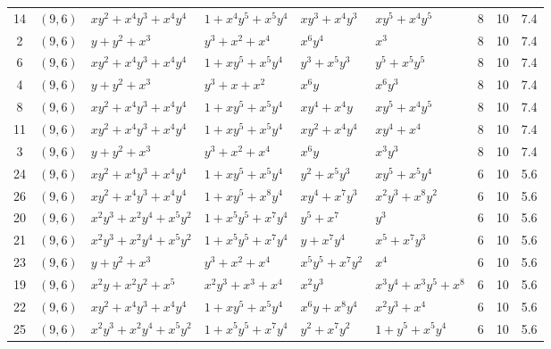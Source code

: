\begin{table}[t]
\begin{tabular*}{\textwidth}{@{\extracolsep{\fill}}cllllllcc}
14 & $(9,6)$ & $xy^{2}{+}x^{4}y^{3}{+}x^{4}y^{4}$ & $1{+}x^{4}y^{5}{+}x^{5}y^{4}$ & $xy^{3}{+}x^{4}y^{3}$ & $xy^{5}{+}x^{4}y^{5}$ & 8 & 10 & 7.4 \\
2 & $(9,6)$ & $y{+}y^{2}{+}x^{3}$ & $y^{3}{+}x^{2}{+}x^{4}$ & $x^{6}y^{4}$ & $x^{3}$ & 8 & 10 & 7.4 \\
6 & $(9,6)$ & $xy^{2}{+}x^{4}y^{3}{+}x^{4}y^{4}$ & $1{+}xy^{5}{+}x^{5}y^{4}$ & $y^{3}{+}x^{5}y^{3}$ & $y^{5}{+}x^{5}y^{5}$ & 8 & 10 & 7.4 \\
4 & $(9,6)$ & $y{+}y^{2}{+}x^{3}$ & $y^{3}{+}x{+}x^{2}$ & $x^{6}y$ & $x^{6}y^{3}$ & 8 & 10 & 7.4 \\
8 & $(9,6)$ & $xy^{2}{+}x^{4}y^{3}{+}x^{4}y^{4}$ & $1{+}xy^{5}{+}x^{5}y^{4}$ & $xy^{4}{+}x^{4}y$ & $xy^{5}{+}x^{4}y^{5}$ & 8 & 10 & 7.4 \\
11 & $(9,6)$ & $xy^{2}{+}x^{4}y^{3}{+}x^{4}y^{4}$ & $1{+}xy^{5}{+}x^{5}y^{4}$ & $xy^{2}{+}x^{4}y^{4}$ & $xy^{4}{+}x^{4}$ & 8 & 10 & 7.4 \\
3 & $(9,6)$ & $y{+}y^{2}{+}x^{3}$ & $y^{3}{+}x^{2}{+}x^{4}$ & $x^{6}y$ & $x^{3}y^{3}$ & 8 & 10 & 7.4 \\
24 & $(9,6)$ & $xy^{2}{+}x^{4}y^{3}{+}x^{4}y^{4}$ & $1{+}xy^{5}{+}x^{5}y^{4}$ & $y^{2}{+}x^{5}y^{3}$ & $xy^{5}{+}x^{5}y^{4}$ & 6 & 10 & 5.6 \\
26 & $(9,6)$ & $xy^{2}{+}x^{4}y^{3}{+}x^{4}y^{4}$ & $1{+}xy^{5}{+}x^{8}y^{4}$ & $xy^{4}{+}x^{7}y^{3}$ & $x^{2}y^{3}{+}x^{8}y^{2}$ & 6 & 10 & 5.6 \\
20 & $(9,6)$ & $x^{2}y^{3}{+}x^{2}y^{4}{+}x^{5}y^{2}$ & $1{+}x^{5}y^{5}{+}x^{7}y^{4}$ & $y^{5}{+}x^{7}$ & $y^{3}$ & 6 & 10 & 5.6 \\
21 & $(9,6)$ & $x^{2}y^{3}{+}x^{2}y^{4}{+}x^{5}y^{2}$ & $1{+}x^{5}y^{5}{+}x^{7}y^{4}$ & $y{+}x^{7}y^{4}$ & $x^{5}{+}x^{7}y^{3}$ & 6 & 10 & 5.6 \\
23 & $(9,6)$ & $y{+}y^{2}{+}x^{3}$ & $y^{3}{+}x^{2}{+}x^{4}$ & $x^{5}y^{5}{+}x^{7}y^{2}$ & $x^{4}$ & 6 & 10 & 5.6 \\
19 & $(9,6)$ & $x^{2}y{+}x^{2}y^{2}{+}x^{5}$ & $x^{2}y^{3}{+}x^{3}{+}x^{4}$ & $x^{2}y^{3}$ & $x^{3}y^{4}{+}x^{3}y^{5}{+}x^{8}$ & 6 & 10 & 5.6 \\
22 & $(9,6)$ & $xy^{2}{+}x^{4}y^{3}{+}x^{4}y^{4}$ & $1{+}xy^{5}{+}x^{5}y^{4}$ & $x^{6}y{+}x^{8}y^{4}$ & $x^{2}y^{3}{+}x^{4}$ & 6 & 10 & 5.6 \\
25 & $(9,6)$ & $x^{2}y^{3}{+}x^{2}y^{4}{+}x^{5}y^{2}$ & $1{+}x^{5}y^{5}{+}x^{7}y^{4}$ & $y^{2}{+}x^{7}y^{2}$ & $1{+}y^{5}{+}x^{5}y^{4}$ & 6 & 10 & 5.6 \\

\end{tabular*}
\end{table}
